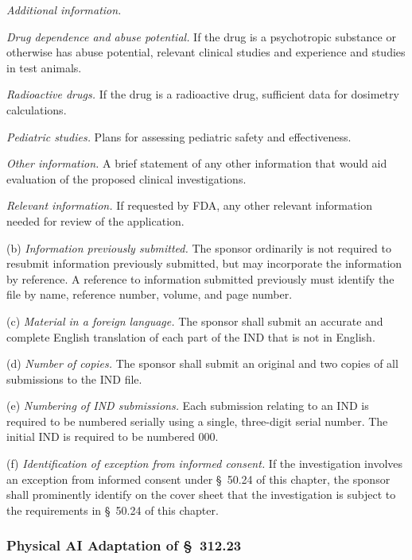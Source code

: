 \begin{description}[leftmargin=0.5cm,style=sameline]
\item[(10)] \textit{Additional information.}
\begin{description}[leftmargin=0.8cm,style=sameline]
\item[(i)] \textit{Drug dependence and abuse potential.} If the drug is a psychotropic substance or otherwise has abuse potential, relevant clinical studies and experience and studies in test animals.
\item[(ii)] \textit{Radioactive drugs.} If the drug is a radioactive drug, sufficient data for dosimetry calculations.
\item[(iii)] \textit{Pediatric studies.} Plans for assessing pediatric safety and effectiveness.
\item[(iv)] \textit{Other information.} A brief statement of any other information that would aid evaluation of the proposed clinical investigations.
\end{description}

\item[(11)] \textit{Relevant information.} If requested by FDA, any other relevant information needed for review of the application.
\end{description}

(b) \textit{Information previously submitted.} The sponsor ordinarily is not required to resubmit information previously submitted, but may incorporate the information by reference. A reference to information submitted previously must identify the file by name, reference number, volume, and page number.

(c) \textit{Material in a foreign language.} The sponsor shall submit an accurate and complete English translation of each part of the IND that is not in English.

(d) \textit{Number of copies.} The sponsor shall submit an original and two copies of all submissions to the IND file.

(e) \textit{Numbering of IND submissions.} Each submission relating to an IND is required to be numbered serially using a single, three-digit serial number. The initial IND is required to be numbered 000.

(f) \textit{Identification of exception from informed consent.} If the investigation involves an exception from informed consent under \S~50.24 of this chapter, the sponsor shall prominently identify on the cover sheet that the investigation is subject to the requirements in \S~50.24 of this chapter.

\subsubsection{Physical AI Adaptation of \S~312.23}

